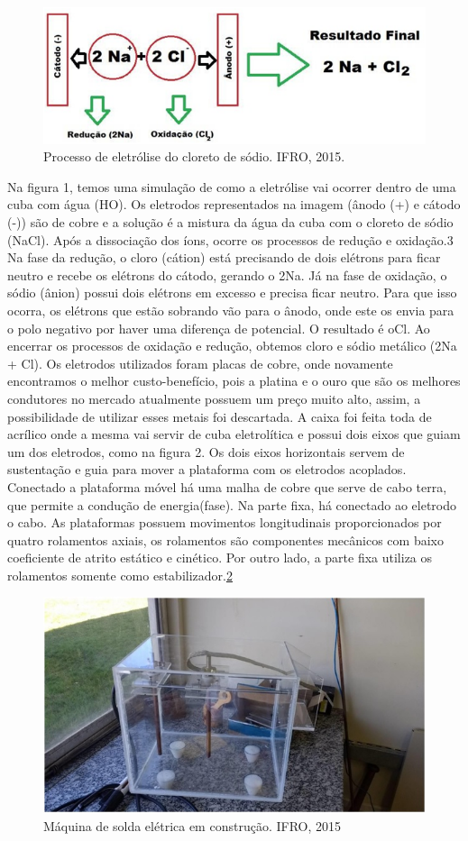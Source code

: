 \documentclass[article,12pt,onesidea,4paper,english,brazil]{abntex2}
\begin{document}
	\begin{figure}[h]
		\centering
		\includegraphics[width=0.7\linewidth]{pip-67-1}
		\caption{ Processo de eletrólise do cloreto de sódio. IFRO, 2015.}
		\label{fig:pip-67-1}
	\end{figure}
Na figura 1, temos uma simulação de como a eletrólise vai ocorrer dentro de
uma cuba com água (HO). Os eletrodos representados na imagem (ânodo (+) e
cátodo (-)) são de cobre e a solução é a mistura da água da cuba com o cloreto de
sódio (NaCl). Após a dissociação dos íons, ocorre os processos de redução e
oxidação.3
Na fase da redução, o cloro (cátion) está precisando de dois elétrons para ficar
neutro e recebe os elétrons do cátodo, gerando o 2Na.
Já na fase de oxidação, o sódio (ânion) possui dois elétrons em excesso e
precisa ficar neutro. Para que isso ocorra, os elétrons que estão sobrando vão para
o ânodo, onde este os envia para o polo negativo por haver uma diferença de
potencial. O resultado é oCl.
Ao encerrar os processos de oxidação e redução, obtemos cloro e sódio
metálico (2Na + Cl).
Os eletrodos utilizados foram placas de cobre, onde novamente encontramos o
melhor custo-benefício, pois a platina e o ouro que são os melhores condutores no
mercado atualmente possuem um preço muito alto, assim, a possibilidade de utilizar
esses metais foi descartada.
A caixa foi feita toda de acrílico onde a mesma vai servir de cuba eletrolítica e
possui dois eixos que guiam um dos eletrodos, como na figura 2. Os dois eixos
horizontais servem de sustentação e guia para mover a plataforma com os eletrodos
acoplados. Conectado a plataforma móvel há uma malha de cobre que serve de
cabo terra, que permite a condução de energia(fase).
Na parte fixa, há conectado ao eletrodo o cabo. As plataformas possuem
movimentos longitudinais proporcionados por quatro rolamentos axiais, os
rolamentos são componentes mecânicos com baixo coeficiente de atrito estático e
cinético. Por outro lado, a parte fixa utiliza os rolamentos somente como
estabilizador.\ref{fig:pip-68-01}
\begin{figure}[h]
	\centering
	\includegraphics[width=0.7\linewidth]{pip-68-01}
	\caption{Máquina de solda elétrica em construção. IFRO, 2015}
	\label{fig:pip-68-01}
\end{figure}
\end{document}
